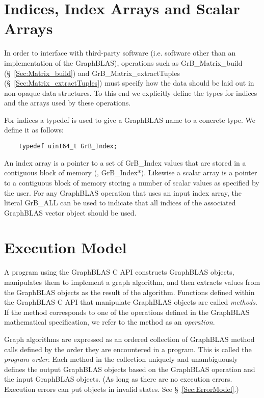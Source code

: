 \section{Indices, Index Arrays and Scalar Arrays}

In order to interface with third-party software (i.e. software other than
an implementation of the GraphBLAS), operations 
such as {\sf GrB\_Matrix\_build} (\S~\ref{Sec:Matrix_build}) and
{\sf GrB\_Matrix\_extractTuples} (\S~\ref{Sec:Matrix_extractTuples}) must specify
how the data should be laid out in  non-opaque data structures.  To 
this end we explicitly define the types for indices and the arrays 
used by these operations.

For indices a typedef is used to give a GraphBLAS name to a concrete type. We define it as follows:

\begin{verbatim}
    typedef uint64_t GrB_Index;
\end{verbatim}

An index array is a pointer to a set of {\sf GrB\_Index} values that are 
stored in a contiguous block of memory (\ie, {\sf GrB\_Index*}).
Likewise a scalar array is a pointer to a contiguous block of memory 
storing a number of scalar values as specified by the user.
For any GraphBLAS operation that uses an input index array, the literal {\sf GrB\_ALL} 
can be used to indicate that all indices of the associated GraphBLAS vector object should be used.


\section{Execution Model}
\label{Sec:ExecutionModel}

A program using the GraphBLAS C API constructs GraphBLAS objects,
manipulates them to implement a graph algorithm, and then extracts
values from the GraphBLAS objects as the result of the algorithm.
Functions defined within the GraphBLAS C API that manipulate GraphBLAS
objects are called \emph{methods}.  If the method corresponds to one
of the operations defined in the GraphBLAS mathematical specification,
we refer to the method as an \emph{operation}.

Graph algorithms are expressed as an ordered collection of GraphBLAS
method calls defined by the order they are encountered in a program.
This is called the \emph{program order}.  Each method in the collection
uniquely and unambiguously defines the output GraphBLAS objects based
on the GraphBLAS operation and the input GraphBLAS objects. (As long
as there are no execution errors. Execution errors can put objects in
invalid states. See \S~\ref{Sec:ErrorModel}.)

